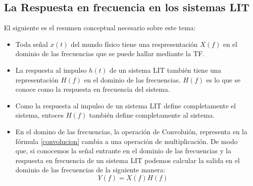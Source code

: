 \subsection{La Respuesta en frecuencia en los sistemas LIT}
El siguiente es el resumen conceptual necesario sobre este tema:
\begin{itemize} 
\item Toda señal $x(t)$ del mundo físico tiene una respresentación $X(f)$ en el dominio de las frecuencias que se puede hallar mediante la TF. 
\item La respuesta al impulso $h(t)$ de un sistema LIT también tiene una representación $ H(f)$ en el dominio de las frecuencias. $H(f)$ es lo que se conoce como la respuesta en frecuencia del sistema. 
\item Como la respuesta al impulso de un sistema LIT define completamente el sistema, entoces $H(f)$ también define completamente al sistema.
\item En el domino de las frecuencias, la operación de Convoluión, representa en la fórmula \ref{convolucion} cambia a una operación de multiplicación. De modo que, si conocemos la señal entrante en el dominio de las frecuencias y la respuesta en frecuencia de un sistema LIT podemos calcular la salida en el dominio de las frecuencias de la siguiente manera:
\begin{equation} \label{multiplicacionenfrec}
	 Y(f)=X(f)H(f)				
\end{equation}

\end{itemize}
